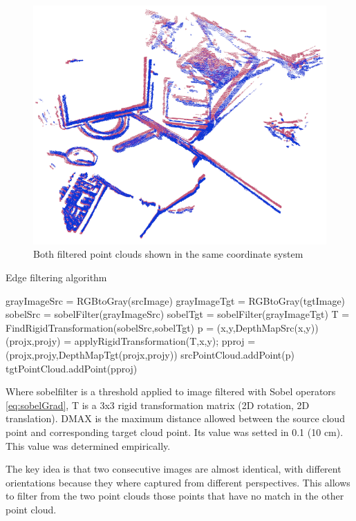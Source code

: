 \begin{figure}[H]
\begin{center}
\includegraphics[scale=0.3]{images/borders_both.png}
\caption{Both filtered point clouds shown in the same coordinate system}
\end{center}
\end{figure}


\begin{algorithm}[H]
\caption{Edge filtering algorithm}
\begin{algorithmic}[1]
\State grayImageSrc = RGBtoGray(srcImage)
\State grayImageTgt = RGBtoGray(tgtImage)
\State sobelSrc = sobelFilter(grayImageSrc)
\State sobelTgt = sobelFilter(grayImageTgt)
\State T = FindRigidTransformation(sobelSrc,sobelTgt)
\State p = (x,y,DepthMapSrc(x,y))
\State (projx,projy) = applyRigidTransformation(T,x,y);
\State pproj = (projx,projy,DepthMapTgt(projx,projy))
\State srcPointCloud.addPoint(p)
\State tgtPointCloud.addPoint(pproj)
\EndIf
\EndIf
\EndIf
\EndFor
\end{algorithmic}
\end{algorithm}

Where sobelfilter is a threshold applied to image filtered with Sobel operators \ref{eq:sobelGrad}, T is a 3x3 rigid transformation matrix (2D rotation, 2D translation). DMAX is the maximum distance allowed between the source cloud point and corresponding target cloud point. 
Its value was setted in 0.1 (10 cm).  This value was determined empirically.

The key idea is that two consecutive images are almost identical, 
with different orientations because they where captured from different perspectives. This allows 
to filter from the two point clouds those points that have no match in the other point cloud.

